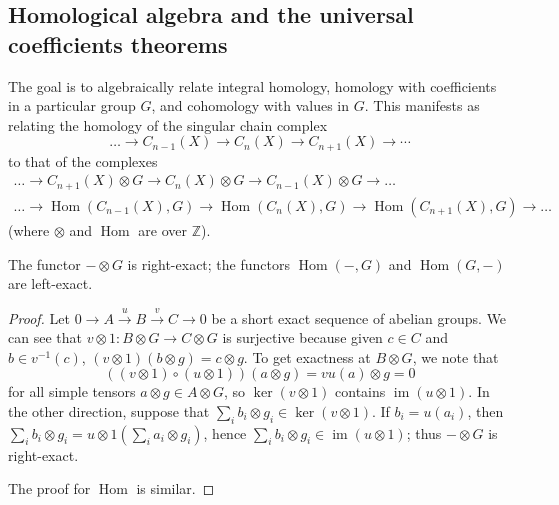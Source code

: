 \documentclass[10pt]{article}
\providecommand{\ZZ}{\mathbb Z}
\providecommand{\opname}{\operatorname}
\providecommand{\im}{\opname{im}}
\providecommand{\inv}{^{-1}}
\newcommand{\tensor}{\otimes}
\newcommand{\Hom}{\opname{Hom}}
\begin{document}

\subsection{Homological algebra and the universal coefficients theorems}

The goal is to algebraically relate integral homology,
homology with coefficients in a particular group $G$,
and cohomology with values in $G$.
This manifests as relating the homology of the singular chain complex
\begin{equation*}
    \dots\to C_{n-1}(X)\to C_n(X)\to C_{n+1}(X)\to\cdots
\end{equation*}
to that of the complexes
\begin{gather*}
    \dots\to C_{n+1}(X)\tensor G
    \to C_{n}(X)\tensor G
    \to C_{n-1}(X)\tensor G
    \to\dots
    \\
    \dots\to \Hom(C_{n-1}(X),G)
    \to \Hom(C_n(X),G)
    \to \Hom(C_{n+1}(X),G)
    \to\dots
\end{gather*}
(where $\otimes$ and $\Hom$ are over $\ZZ$).

\begin{prop}
    \label{prop:left-right-exactness}
    The functor $-\otimes G$ is right-exact;
    the functors $\Hom(-,G)$ and $\Hom(G,-)$ are left-exact.
\end{prop}

\begin{proof}
    Let $0\to A\overset u\to B\overset v\to C\to 0$
    be a short exact sequence of abelian groups.
    We can see that $v\tensor 1\colon B\tensor G\to C\tensor G$
    is surjective because given $c\in C$ and $b\in v\inv(c)$,
    $(v\tensor 1)(b\tensor g) = c\tensor g$.
    To get exactness at $B\tensor G$,
    we note that
    \begin{equation*}
	((v\tensor 1)\circ(u\tensor 1))(a\tensor g)
	= vu(a)\tensor g = 0
    \end{equation*}
    for all simple tensors $a\tensor g\in A\tensor G$,
    so $\ker(v\tensor 1)$ contains $\im(u\tensor 1)$.
    In the other direction, suppose that
    $\sum_i b_i\tensor g_i\in\ker(v\tensor 1)$.
    If $b_i = u(a_i)$, then $\sum_i b_i\tensor g_i
    = u\tensor 1(\sum_i a_i\tensor g_i)$,
    hence $\sum_i b_i\tensor g_i\in\im(u\tensor 1)$;
    thus $-\tensor G$ is right-exact.

    The proof for $\Hom$ is similar.
\end{proof}
\end{document}

